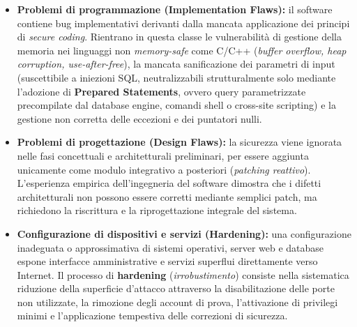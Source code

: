 \documentclass[../../main.tex]{subfiles}
\begin{document}
\begin{itemize}
    \item \textbf{Problemi di programmazione (Implementation Flaws):} il software contiene bug implementativi derivanti dalla mancata applicazione dei principi di \textit{secure coding}. Rientrano in questa classe le vulnerabilità di gestione della memoria nei linguaggi non \textit{memory-safe} come C/C++ (\textit{buffer overflow, heap corruption, use-after-free}), la mancata sanificazione dei parametri di input (suscettibile a iniezioni SQL, neutralizzabili strutturalmente solo mediante l'adozione di \textbf{Prepared Statements}, ovvero query parametrizzate precompilate dal database engine, comandi shell o cross-site scripting) e la gestione non corretta delle eccezioni e dei puntatori nulli.
    
    \item \textbf{Problemi di progettazione (Design Flaws):} la sicurezza viene ignorata nelle fasi concettuali e architetturali preliminari, per essere aggiunta unicamente come modulo integrativo a posteriori (\textit{patching reattivo}). L'esperienza empirica dell'ingegneria del software dimostra che i difetti architetturali non possono essere corretti mediante semplici patch, ma richiedono la riscrittura e la riprogettazione integrale del sistema.
    
    \item \textbf{Configurazione di dispositivi e servizi (Hardening):} una configurazione inadeguata o approssimativa di sistemi operativi, server web e database espone interfacce amministrative e servizi superflui direttamente verso Internet. Il processo di \textbf{hardening} (\textit{irrobustimento}) consiste nella sistematica riduzione della superficie d'attacco attraverso la disabilitazione delle porte non utilizzate, la rimozione degli account di prova, l'attivazione di privilegi minimi e l'applicazione tempestiva delle correzioni di sicurezza.
    

\end{itemize}
\end{document}

